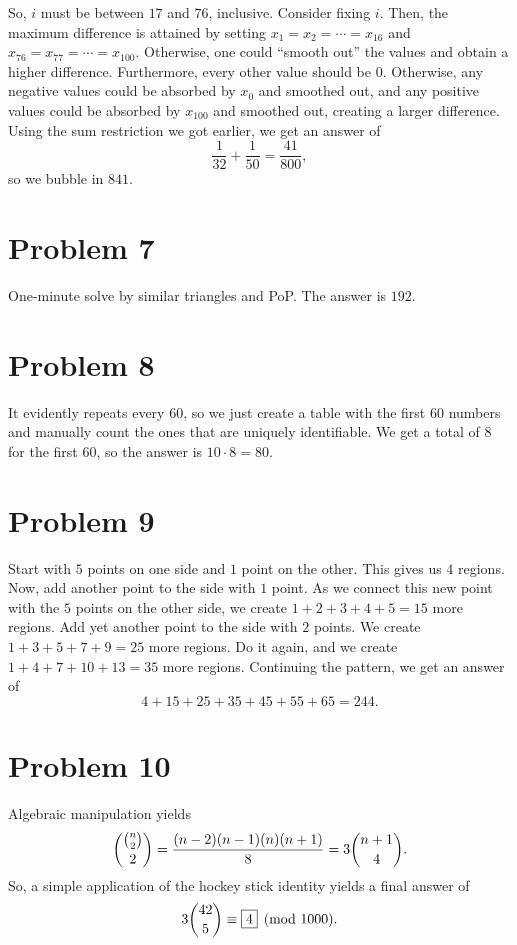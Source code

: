 \documentclass{scrartcl}
\begin{document}
So, $i$ must be between $17$ and $76$, inclusive.
Consider fixing $i$.
Then, the maximum difference is attained by setting $x_1 = x_2 = \cdots = x_{16}$
and $x_{76} = x_{77} = \cdots = x_{100}$.
Otherwise, one could ``smooth out'' the values and obtain a higher difference.
Furthermore, every other value should be $0$. Otherwise, any negative values could be absorbed by $x_0$
and smoothed out, and any positive values could be absorbed by $x_{100}$ and smoothed out,
creating a larger difference.
Using the sum restriction we got earlier,
we get an answer of
\[ \frac{1}{32} + \frac{1}{50} = \frac{41}{800}, \]
so we bubble in $\boxed{841}$.
\section*{Problem 7}
One-minute solve by similar triangles and PoP. The answer is $\boxed{192}$.

\section*{Problem 8}
It evidently repeats every $60$,
so we just create a table with the first $60$ numbers
and manually count the ones that are uniquely identifiable.
We get a total of $8$ for the first $60$,
so the answer is $10 \cdot 8 = \boxed{80}$.

\section*{Problem 9}
Start with $5$ points on one side and $1$ point on the other.
This gives us $4$ regions.
Now, add another point to the side with $1$ point.
As we connect this new point with the $5$ points on the other side,
we create $1 + 2 + 3 + 4 + 5 = 15$ more regions.
Add yet another point to the side with $2$ points.
We create $1 + 3 + 5 + 7 + 9 = 25$ more regions.
Do it again, and we create $1 + 4 + 7 + 10 + 13 = 35$ more regions.
Continuing the pattern, we get an answer of
\[ 4 + 15 + 25 + 35 + 45 + 55 + 65 = \boxed{244}. \]

\section*{Problem 10}
Algebraic manipulation yields
\[ \dbinom{\binom{n}{2}}{2} = \frac{(n-2)(n-1)(n)(n+1)}{8} = 3 \dbinom{n+1}{4}. \]
So, a simple application of the hockey stick identity yields a final answer of
\[ 3 \dbinom{42}{5} \equiv \boxed{4} \pmod{1000}. \]
\end{document}
